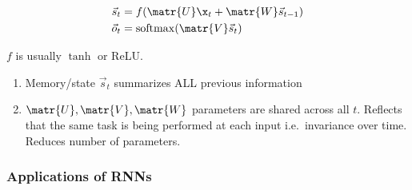 \documentclass[a4paper,oneside,reqno,onecolumn]{amsart}
\newcommand{\U}{\matr{U}}
\newcommand{\V}{\matr{V}}
\newcommand{\W}{\matr{W}}
\newcommand{\s}{\vec{s}}
\renewcommand{\o}{\vec{o}}
\DeclareMathOperator*{\softmax}{softmax}
\begin{document}
\begin{align}
    \s_t &= f(\U \x_t + \W \s_{t-1}) \\
    \o_t &= \softmax( \V \s_t)
\end{align}

$f$ is usually $\tanh$ or ReLU.

\begin{enumerate}
    \item Memory/state $\s_t$ summarizes ALL previous information
    \item $\U, \V, \W$ parameters are shared across all $t$. Reflects
        that the same task is being performed at each input i.e.\
        invariance over time. Reduces number of parameters.
\end{enumerate}

\subsubsection{Applications of RNNs}
\end{document}
